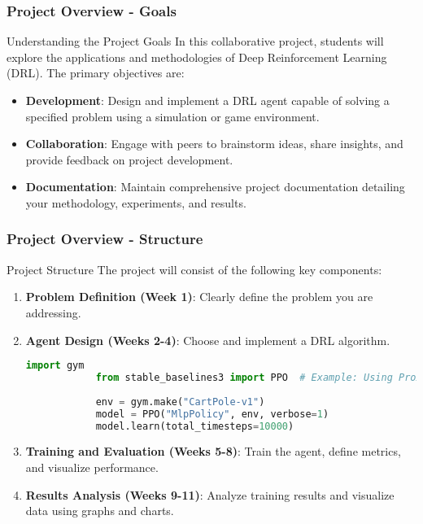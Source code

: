 \documentclass[aspectratio=169]{beamer}
\begin{document}
\begin{frame}[fragile]
    \frametitle{Project Overview - Goals}
    \begin{block}{Understanding the Project Goals}
        In this collaborative project, students will explore the applications and methodologies of Deep Reinforcement Learning (DRL). The primary objectives are:
    \end{block}
    \begin{itemize}
        \item \textbf{Development}: Design and implement a DRL agent capable of solving a specified problem using a simulation or game environment.
        \item \textbf{Collaboration}: Engage with peers to brainstorm ideas, share insights, and provide feedback on project development.
        \item \textbf{Documentation}: Maintain comprehensive project documentation detailing your methodology, experiments, and results.
    \end{itemize}
\end{frame}

\begin{frame}[fragile]
    \frametitle{Project Overview - Structure}
    \begin{block}{Project Structure}
        The project will consist of the following key components:
    \end{block}
    \begin{enumerate}
        \item \textbf{Problem Definition (Week 1)}: Clearly define the problem you are addressing.
        \item \textbf{Agent Design (Weeks 2-4)}: Choose and implement a DRL algorithm.
            \begin{lstlisting}[language=Python]
            import gym
            from stable_baselines3 import PPO  # Example: Using Proximal Policy Optimization
            
            env = gym.make("CartPole-v1")
            model = PPO("MlpPolicy", env, verbose=1)
            model.learn(total_timesteps=10000)
            \end{lstlisting}
        \item \textbf{Training and Evaluation (Weeks 5-8)}: Train the agent, define metrics, and visualize performance.
        \item \textbf{Results Analysis (Weeks 9-11)}: Analyze training results and visualize data using graphs and charts.
    \end{enumerate}
\end{frame}
\end{document}
